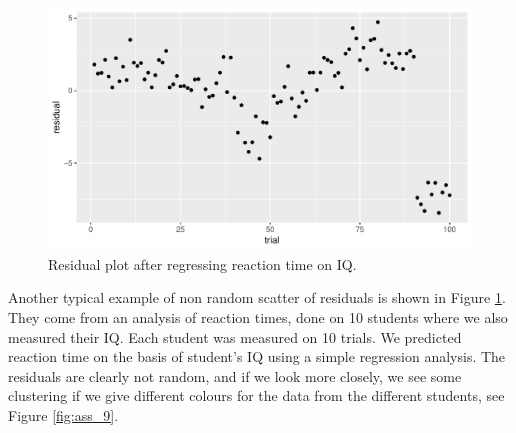 \documentclass[]{book}\usepackage[]{graphicx}\usepackage[]{color}
\makeatletter
\def\maxwidth{ %
  \ifdim\Gin@nat@width>\linewidth
    \linewidth
  \else
    \Gin@nat@width
  \fi
}
\newenvironment{knitrout}{}{} %
\makeatother
\begin{document}
\begin{knitrout}
\color{fgcolor}\begin{figure}

{\centering \includegraphics[width=\maxwidth]{figure/ass_8-1} 

}

\caption[Residual plot after regressing reaction time on IQ]{Residual plot after regressing reaction time on IQ.}\label{fig:ass_8}
\end{figure}


\end{knitrout}

Another typical example of non random scatter of residuals is shown in Figure \ref{fig:ass_8}. They come from an analysis of reaction times, done on 10 students where we also measured their IQ. Each student was measured on 10 trials. We predicted reaction time on the basis of student's IQ using a simple regression analysis. The residuals are clearly not random, and if we look more closely, we see some clustering if we give different colours for the data from the different students, see Figure \ref{fig:ass_9}.
\end{document}
